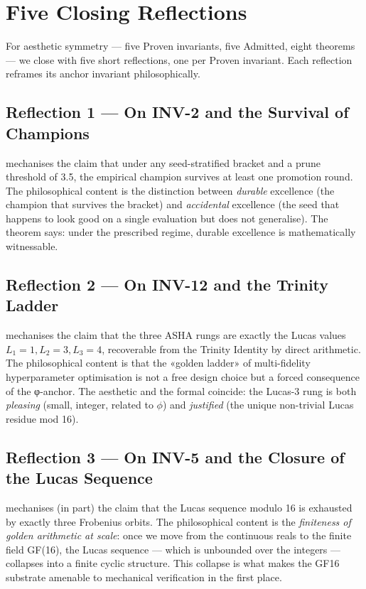 \section{Five Closing Reflections}
\label{sec:32-five-reflections}

For aesthetic symmetry — five Proven invariants, five Admitted, eight
theorems — we close with five short reflections, one per Proven invariant.
Each reflection reframes its anchor invariant philosophically.

\subsection{Reflection 1 — On INV-2 and the Survival of Champions}
\label{sec:32-refl-1}

 mechanises the claim that under any
seed-stratified bracket and a prune threshold of 3.5, the empirical champion
survives at least one promotion round. The philosophical content is the
distinction between \emph{durable} excellence (the champion that survives the
bracket) and \emph{accidental} excellence (the seed that happens to look good
on a single evaluation but does not generalise). The theorem says: under the
prescribed regime, durable excellence is mathematically witnessable.

\subsection{Reflection 2 — On INV-12 and the Trinity Ladder}
\label{sec:32-refl-2}

 mechanises the claim that the three
ASHA rungs are exactly the Lucas values $L_{1}=1, L_{2}=3, L_{3}=4$,
recoverable from the Trinity Identity by direct arithmetic. The
philosophical content is that the «golden ladder» of multi-fidelity
hyperparameter optimisation is not a free design choice but a forced
consequence of the φ-anchor. The aesthetic and the formal coincide: the
Lucas-3 rung is both \emph{pleasing} (small, integer, related to $\phi$) and
\emph{justified} (the unique non-trivial Lucas residue mod 16).

\subsection{Reflection 3 — On INV-5 and the Closure of the Lucas Sequence}
\label{sec:32-refl-3}

 mechanises (in part) the claim that the
Lucas sequence modulo 16 is exhausted by exactly three Frobenius orbits.
The philosophical content is the \emph{finiteness of golden arithmetic at
scale}: once we move from the continuous reals to the finite field GF(16),
the Lucas sequence — which is unbounded over the integers — collapses into a
finite cyclic structure. This collapse is what makes the GF16 substrate
amenable to mechanical verification in the first place.

